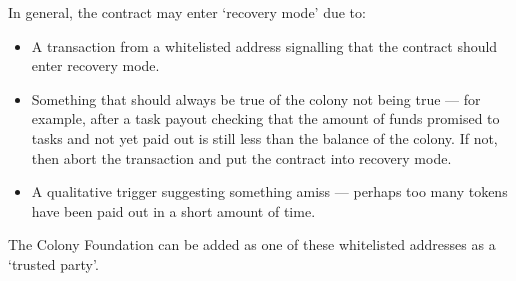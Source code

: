 In general, the contract may enter `recovery mode' due to:
\begin{itemize}
 \item A transaction from a whitelisted address signalling that the contract should enter recovery mode.
 \item Something that should always be true of the colony not being true --- for example, after a task payout checking that the amount of funds promised to tasks and not yet paid out is still less than the balance of the colony. If not, then abort the transaction and put the contract into recovery mode.
 \item A qualitative trigger suggesting something amiss --- perhaps too many tokens have been paid out in a short amount of time.
\end{itemize}

The Colony Foundation can be added as one of these whitelisted addresses as a `trusted party'.
